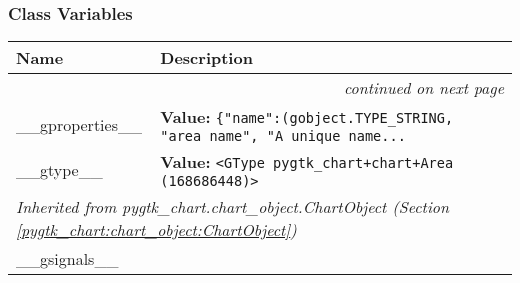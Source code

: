 
  \subsubsection{Class Variables}

    \vspace{-1cm}
\hspace{\varindent}\begin{longtable}{|p{\varnamewidth}|p{\vardescrwidth}|l}
\cline{1-2}
\cline{1-2} \centering \textbf{Name} & \centering \textbf{Description}& \\
\cline{1-2}
\endhead\cline{1-2}\multicolumn{3}{r}{\small\textit{continued on next page}}\\\endfoot\cline{1-2}
\endlastfoot\raggedright \_\-\_\-g\-p\-r\-o\-p\-e\-r\-t\-i\-e\-s\-\_\-\_\- & \raggedright \textbf{Value:} 
{\tt \{"name":(gobject.TYPE\_STRING, "area name", "A unique name\texttt{...}}&\\
\cline{1-2}
\raggedright \_\-\_\-g\-t\-y\-p\-e\-\_\-\_\- & \raggedright \textbf{Value:} 
{\tt {\textless}GType pygtk\_chart+chart+Area (168686448){\textgreater}}&\\
\cline{1-2}
\multicolumn{2}{|l|}{\textit{Inherited from pygtk\_chart.chart\_object.ChartObject \textit{(Section \ref{pygtk_chart:chart_object:ChartObject})}}}\\
\multicolumn{2}{|p{\varwidth}|}{\raggedright \_\_gsignals\_\_}\\
\cline{1-2}
\end{longtable}

